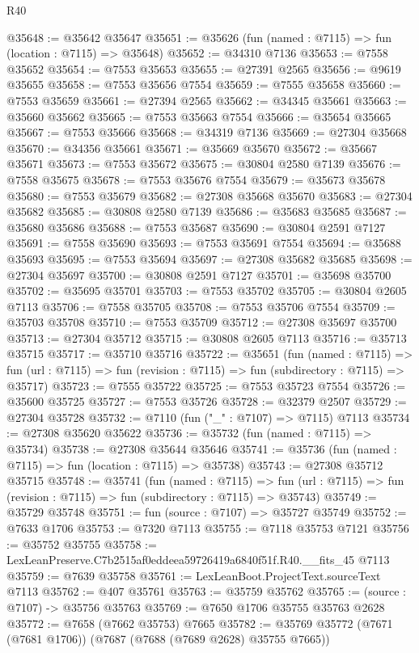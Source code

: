 \begin{lexlean}{R40}
\begin{coremodule}
@35648 := @35642 @35647
@35651 := @35626 (fun (named : @7115) => fun (location : @7115) => @35648)
@35652 := @34310 @7136
@35653 := @7558 @35652
@35654 := @7553 @35653
@35655 := @27391 @2565
@35656 := @9619 @35655
@35658 := @7553 @35656 @7554
@35659 := @7555 @35658
@35660 := @7553 @35659
@35661 := @27394 @2565
@35662 := @34345 @35661
@35663 := @35660 @35662
@35665 := @7553 @35663 @7554
@35666 := @35654 @35665
@35667 := @7553 @35666
@35668 := @34319 @7136
@35669 := @27304 @35668
@35670 := @34356 @35661
@35671 := @35669 @35670
@35672 := @35667 @35671
@35673 := @7553 @35672
@35675 := @30804 @2580 @7139
@35676 := @7558 @35675
@35678 := @7553 @35676 @7554
@35679 := @35673 @35678
@35680 := @7553 @35679
@35682 := @27308 @35668 @35670
@35683 := @27304 @35682
@35685 := @30808 @2580 @7139
@35686 := @35683 @35685
@35687 := @35680 @35686
@35688 := @7553 @35687
@35690 := @30804 @2591 @7127
@35691 := @7558 @35690
@35693 := @7553 @35691 @7554
@35694 := @35688 @35693
@35695 := @7553 @35694
@35697 := @27308 @35682 @35685
@35698 := @27304 @35697
@35700 := @30808 @2591 @7127
@35701 := @35698 @35700
@35702 := @35695 @35701
@35703 := @7553 @35702
@35705 := @30804 @2605 @7113
@35706 := @7558 @35705
@35708 := @7553 @35706 @7554
@35709 := @35703 @35708
@35710 := @7553 @35709
@35712 := @27308 @35697 @35700
@35713 := @27304 @35712
@35715 := @30808 @2605 @7113
@35716 := @35713 @35715
@35717 := @35710 @35716
@35722 := @35651
    (fun (named : @7115) =>
    fun (url : @7115) => fun (revision : @7115) => fun (subdirectory : @7115) => @35717)
@35723 := @7555 @35722
@35725 := @7553 @35723 @7554
@35726 := @35600 @35725
@35727 := @7553 @35726
@35728 := @32379 @2507
@35729 := @27304 @35728
@35732 := @7110 (fun ("_" : @7107) => @7115) @7113
@35734 := @27308 @35620 @35622
@35736 := @35732 (fun (named : @7115) => @35734)
@35738 := @27308 @35644 @35646
@35741 := @35736 (fun (named : @7115) => fun (location : @7115) => @35738)
@35743 := @27308 @35712 @35715
@35748 := @35741
    (fun (named : @7115) =>
    fun (url : @7115) => fun (revision : @7115) => fun (subdirectory : @7115) => @35743)
@35749 := @35729 @35748
@35751 := fun (source : @7107) => @35727 @35749
@35752 := @7633 @1706
@35753 := @7320 @7113
@35755 := @7118 @35753 @7121
@35756 := @35752 @35755
@35758 := LexLeanPreserve.C7b2515af0eddeea59726419a6840f51f.R40.__fits_45 @7113
@35759 := @7639 @35758
@35761 := LexLeanBoot.ProjectText.sourceText @7113
@35762 := @407 @35761
@35763 := @35759 @35762
@35765 := (source : @7107) -> @35756 @35763
@35769 := @7650 @1706 @35755 @35763 @2628
@35772 := @7658 (@7662 @35753) @7665
@35782 := @35769 @35772 (@7671 (@7681 @1706)) (@7687 (@7688 (@7689 @2628) @35755 @7665))

\end{coremodule}
\end{lexlean}
